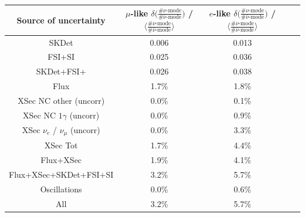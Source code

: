 \begin{table}
\center
\begin{tabular}{| c || c | c || c | c |}
\hline
Source of uncertainty 
&$\mu$-like ${\delta} \Big( \frac{\# {\nu} \text{-mode}}{\# {\bar{\nu}} \text{-mode} } \Big) $ / $\Big \langle \frac{\# {\nu} \text{-mode}}{\# {\bar{\nu}} \text{-mode} } \Big \rangle$ 
&$e$-like ${\delta} \Big( \frac{\# {\nu} \text{-mode}}{\# {\bar{\nu}} \text{-mode} } \Big) $ / $\Big \langle \frac{\# {\nu} \text{-mode}}{\# {\bar{\nu}} \text{-mode} } \Big \rangle$ \\

\hline
SKDet & 0.006  & 0.013 \\ \hline
FSI+SI & 0.025 & 0.036 \\ \hline
SKDet+FSI+ & 0.026 & 0.038 \\ \hline
\hline
Flux & 1.7\% & 1.8\% \\ \hline
XSec NC other (uncorr) & 0.0\% & 0.1\% \\ \hline
XSec NC $1\gamma$ (uncorr) & 0.0\% & 0.9\% \\ \hline
XSec $\nu_e$ / $\nu_{\mu}$ (uncorr) & 0.0\% & 3.3\% \\ \hline
XSec Tot & 1.7\% & 4.4\% \\ \hline
 \hline
Flux+XSec & 1.9\% & 4.1\% \\ \hline
 \hline
Flux+XSec+SKDet+FSI+SI & 3.2\% & 5.7\% \\ \hline
 \hline
Oscillations & 0.0\% & 0.6\% \\ \hline
 \hline
All & 3.2\% & 5.7\% \\ \hline



\end{tabular}
\end{table}
